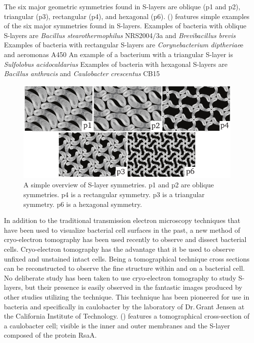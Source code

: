 The six major geometric symmetries found in
\acp{S-layer} are oblique (p1 and p2), triangular (p3), rectangular (p4), and hexagonal
(p6).  () features simple examples of the six major
symmetries found in \acp{S-layer}.  Examples of bacteria with oblique \acp{S-layer} are
\textit{Bacillus stearothermophilus} NRS2004$/$3a and
\textit{Brevibacillus brevis} Examples of bacteria with rectangular
\acp{S-layer} are \textit{Corynebacterium
  diptheriae}e and \acl{aeromonas}
A450 An example of a bacterium with a
triangular \ac{S-layer} is \textit{Sulfolobus acidocaldarius} Examples
of bacteria with hexagonal \acp{S-layer} are \textit{Bacillus anthracis}
and \textit{Caulobacter crescentus} CB15

\begin{figure}[htb] %
  \begin{center}
    \includegraphics[]{intro/img/symmetries.pdf}
  \end{center}
  \caption[A simple overview of \ac{S-layer} symmetries]{A simple overview of \ac{S-layer}
    symmetries. p1 and p2 are oblique symmetries.  p4 is a rectangular symmetry.  p3 is a triangular
    symmetry.  p6 is a hexagonal symmetry.}
  \label{fig:symmetries}
\end{figure}
   
In addition to the traditional transmission electron microscopy techniques that have been used to
visualize bacterial cell surfaces in the past, a new method of cryo-electron tomography has been
used recently to observe and dissect bacterial cells. Cryo-electron tomography has the advantage
that it be used to observe unfixed and unstained intact cells. Being a tomographical technique cross
sections can be reconstructed to observe the fine structure within and on a bacterial cell. No
deliberate study has been taken to use cryo-electron tomography to study \acp{S-layer}, but their
presence is easily observed in the fantastic images produced by other studies utilizing the
technique. This technique has been pioneered for use in bacteria and specifically in \ac{caulobacter} by the laboratory of Dr.\,Grant Jensen at the California Institute of Technology.  () features a tomographical cross-section of a \ac{caulobacter} cell; visible is the inner and outer membranes and the \ac{S-layer} composed of the protein RsaA.

